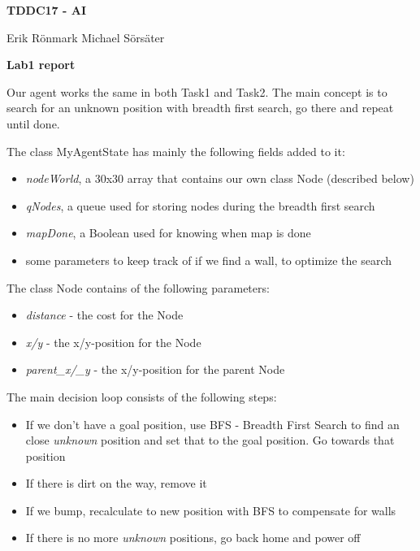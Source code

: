 \documentclass[12pt,a4paper]{article}
\begin{document}
\begin{center}
    \Huge
    \textbf{TDDC17 - AI}

    \vspace{0.3cm}
    \Large
    Erik Rönmark
    Michael Sörsäter
    
    \vspace{0.7cm}
    \textbf{Lab1 report}
\end{center}

Our agent works the same in both Task1 and Task2.
The main concept is to search for an unknown position with breadth first search, go there and repeat until done.

The class MyAgentState has mainly the following fields added to it:
\begin{itemize}
	\item \textit{nodeWorld}, a 30x30 array that contains our own class Node (described below)
	\item \textit{qNodes}, a queue used for storing nodes during the breadth first search
	\item \textit{mapDone}, a Boolean used for knowing when map is done
	\item some parameters to keep track of if we find a wall, to optimize the search
\end{itemize}

The class Node contains of the following parameters:
\begin{itemize}
	\item \textit{distance} - the cost for the Node
	\item \textit{x/y} - the x/y-position for the Node
	\item \textit{parent\_x/\_y} - the x/y-position for the parent Node
\end{itemize}

The main decision loop consists of the following steps:
\begin{itemize}
	\item If we don't have a goal position, use BFS - Breadth First Search to find an close \textit{unknown} position and set that to the goal position. Go towards that position
	\item If there is dirt on the way, remove it
	\item If we bump, recalculate to new position with BFS to compensate for walls
	\item If there is no more \textit{unknown} positions, go back home and power off
\end{itemize}
\end{document}

